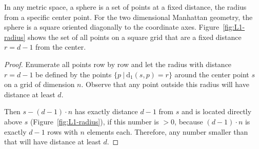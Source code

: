 \documentclass[a4paper,12pt,headsepline]{scrartcl}
\begin{document}
    In any metric space, a sphere is a set of points at a fixed distance, the radius from a specific center point.
    For the two dimensional Manhattan geometry, the sphere is a square oriented diagonally to the coordinate axes.
    Figure~\ref{fig:L1-radius} shows the set of all points on a square grid that are a fixed distance $r = d - 1$ from the center.
    
    \begin{proof}
        Enumerate all points row by row and let the radius with distance $r = d-1$ be defined by the points $\{p \ \vert \ \operatorname{d_1}(s,p) = r\}$ around the center point $s$ on a grid of dimension $n$.
        Observe that any point outside this radius will have distance at least $d$.
        
        Then $s - (d-1) \cdot n$ has exactly distance $d-1$ from $s$ and is located directly above $s$ (Figure~\ref{fig:L1-radius}), if this number is $>0$, because $(d-1) \cdot n$ is exactly $d-1$ rows with $n$ elements each.
        Therefore, any number smaller than that will have distance at least $d$.
    \end{proof}
\end{document}
